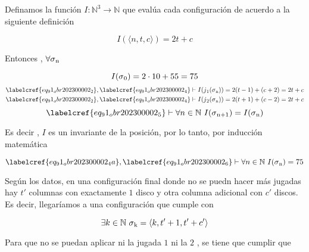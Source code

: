 Definamos la función $I: \mathbb{N}^3 \to \mathbb{N}$ que evalúa cada configuración de acuerdo a la siguiente definición

\begin{equation} \label{eq_91_obr202300002_4}
	I(\langle n, t, c\rangle ) = 2 t + c
\end{equation}

Entonces , $\forall \sigma\textsubscript{n}$

\begin{equation} \label{eq_91_obr202300002_4a}
	I(\sigma\textsubscript{0}) = 2 \cdot 10 + 55 = 75
\end{equation}
\begin{equation} \label{eq_91_obr202300002_5}
\begin{gathered}
	\labelcref{eq_91_obr202300002_2}, \labelcref{eq_91_obr202300002_4} \vdash I(j\textsubscript{1}(\sigma\textsubscript{n})) = 2 (t - 1) + (c + 2) = 2 t + c \\
	\labelcref{eq_91_obr202300002_2}, \labelcref{eq_91_obr202300002_4} \vdash I(j\textsubscript{2}(\sigma\textsubscript{n})) = 2 (t + 1) + (c - 2) = 2 t + c
\end{gathered}
\end{equation}
\begin{equation} \label{eq_91_obr202300002_6}
	\labelcref{eq_91_obr202300002_5} \vdash \forall n \in \mathbb{N}\  I(\sigma\textsubscript{n+1}) =  I(\sigma\textsubscript{n})
\end{equation}

Es decir , $I$ es un invariante de la posición, por lo tanto, por inducción matemática

\begin{equation} \label{eq_91_obr202300002_7}
	\labelcref{eq_91_obr202300002_4a}, \labelcref{eq_91_obr202300002_6} \vdash \forall n \in \mathbb{N}\ I(\sigma\textsubscript{n}) = 75
\end{equation}

Según los datos, en una configuración final donde no se puedn hacer más jugadas hay $t'$ columnas con exactamente $1$ disco y otra columna adicional con $c'$ discos. Es decir, llegaríamos a una configuración que cumple con

\begin{equation} \label{eq_91_obr202300002_8}
	\exists k \in \mathbb{N}\ \sigma\textsubscript{k} = \langle k, t'+1, t' + c'\rangle 
\end{equation}

Para que no se puedan aplicar ni la jugada $1$ ni la $2$ , se tiene que cumplir que 

